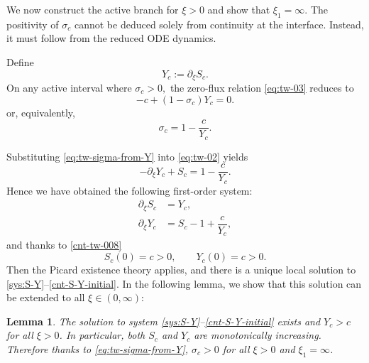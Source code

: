 \documentclass[12pt]{article}
\newtheorem{lemma}[theorem]{Lemma}
\theoremstyle{definition}
\theoremstyle{remark}
\numberwithin{equation}{section}
\begin{document}
We now construct the active branch for \(\xi>0\) and show that $ \xi_1 = \infty $. The positivity of
\(\sigma_c\) cannot be deduced solely from continuity at the interface. Instead,
it must follow from the reduced ODE dynamics.

Define
\begin{equation}\label{def:Y-c}
Y_c:=\partial_\xi S_c.
\end{equation}
On any active interval where
$
\sigma_c>0,
$
the zero-flux relation \eqref{eq:tw-03}
reduces to
\[
-c+(1-\sigma_c)Y_c=0.
\]
or, equivalently, 
\begin{equation}
\sigma_c=1-\frac{c}{Y_c}.
\label{eq:tw-sigma-from-Y}
\end{equation}

Substituting \eqref{eq:tw-sigma-from-Y} into \eqref{eq:tw-02} yields
\[
-\partial_\xi Y_c+S_c
=
1-\frac{c}{Y_c}.
\]
Hence we have obtained the following first-order system:
\begin{subequations}\label{sys:S-Y}
\begin{align}
\partial_\xi S_c&=Y_c,\label{sys:S-Y-1} \\
\partial_\xi Y_c&=S_c-1+\dfrac{c}{Y_c}, \label{sys:S-Y-2}
\end{align}
\end{subequations}
and thanks to \eqref{cnt-tw-008}
\begin{equation}
    \label{cnt-S-Y-initial}
    S_c(0)=c > 0,
    \qquad
    Y_c(0)=c > 0.
\end{equation}
Then the Picard existence theory applies, and there is a
unique local solution to \eqref{sys:S-Y}--\eqref{cnt-S-Y-initial}. In the following lemma, we show that this solution can be extended to all $ \xi \in (0,\infty) $:

\begin{lemma}\label{lm:S-Y-cnt-global}
    The solution to system \eqref{sys:S-Y}--\eqref{cnt-S-Y-initial} exists and $ Y_c > c $ for all $ \xi > 0 $. In particular, both $ S_c $ and $ Y_c $ are monotonically increasing. Therefore thanks to \eqref{eq:tw-sigma-from-Y}, $ \sigma_c > 0 $ for all $ \xi> 0 $ and $ \xi_1 = \infty $. 
\end{lemma}
\end{document}
